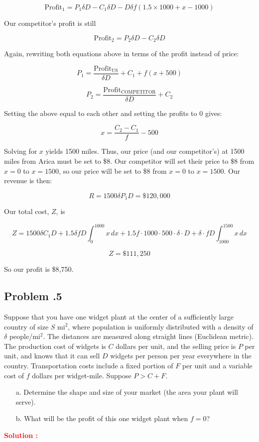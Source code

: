 \documentclass[12pt]{article}
\newcommand{\customsubsection}[1]{
  \subsection*{Problem \thesection.#1}
}
\begin{document}
\begin{itemize}
\[
\text{Profit}_1 = P_1 \delta D - C_1 \delta D - D \delta f \left(1.5 \times 1000 + x - 1000\right)
\]

Our competitor’s profit is still 

\[
\text{Profit}_2 = P_2 \delta D - C_2 \delta D
\]

Again, rewriting both equations above in terms of the profit instead of price:

\[
P_1 = \frac{\text{Profit}_{\text{US}}}{\delta D} + C_1 + f(x + 500)
\]

\[
P_2 = \frac{\text{Profit}_{\text{COMPETITOR}}}{\delta D} + C_2
\]

Setting the above equal to each other and setting the profits to 0 gives:

\[
x = \frac{C_2 - C_1}{f} - 500
\]

Solving for \(x\) yields 1500 miles. Thus, our price (and our competitor's) at 1500 miles from Arica must be set to \$8. Our competitor will set their price to \$8 from \(x = 0\) to \(x = 1500\), so our price will be set to \$8 from \(x = 0\) to \(x = 1500\). Our revenue is then:

\[
R = 1500\delta P_1 D = \$120{,}000
\]

Our total cost, \(Z\), is 

\[
Z = 1500\delta C_1 D + 1.5 \delta f D \int_0^{1000} x \, dx + 1.5 f \cdot 1000 \cdot 500 \cdot \delta \cdot D + \delta \cdot f D \int_{1000}^{1500} x \, dx
\]

\[
Z = \$111{,}250
\]

So our profit is \$8{,}750.

\end{itemize}
\newpage

\customsubsection{5}
Suppose that you have one widget plant at the center of a sufficiently large country of size $S$ mi$^2$, where population is uniformly distributed with a density of $\delta$ people/mi$^2$. The distances are measured along straight lines (Euclidean metric). The production cost of widgets is $C$ dollars per unit, and the selling price is $P$ per unit, and knows that it can sell $D$ widgets per person per year everywhere in the country. Transportation costs include a fixed portion of $F$ per unit and a variable cost of $f$ dollars per widget-mile. Suppose $P > C + F$.

\begin{enumerate}
    \item[a.] Determine the shape and size of your market (the area your plant will serve). 
    \item[b.] What will be the profit of this one widget plant when $f = 0$?
\end{enumerate}
\textbf{\textcolor{red}{Solution :}} 
\end{document}
